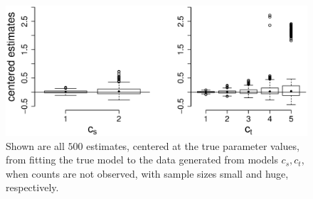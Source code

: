 \begin{figure}
  \centering
  \includegraphics[scale=0.5]{em_bp}
  \caption{Shown are all $500$ estimates, centered at the true parameter values, from fitting the true model to the data generated from models $c_s,c_t$, when counts are not observed, with sample sizes small and huge, respectively.}
  \label{fig:em_bp}
\end{figure}

